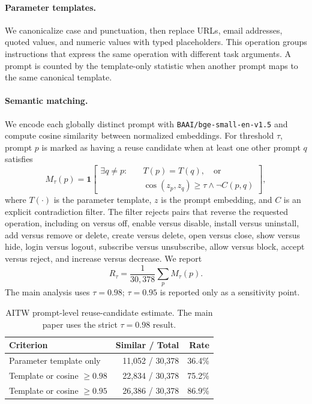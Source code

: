\paragraph{Parameter templates.}
We canonicalize case and punctuation, then replace URLs, email addresses,
quoted values, and numeric values with typed placeholders.  This operation
groups instructions that express the same operation with different task
arguments.  A prompt is counted by the template-only statistic when another
prompt maps to the same canonical template.

\paragraph{Semantic matching.}
We encode each globally distinct prompt with
\texttt{BAAI/bge-small-en-v1.5} and compute cosine similarity between normalized
embeddings.  For threshold $\tau$, prompt $p$ is marked as having a reuse
candidate when at least one other prompt $q$ satisfies
\[
  M_\tau(p)=\mathbf{1}\!\left[
  \begin{aligned}
    \exists q\neq p:\quad &T(p)=T(q),\quad\text{or}\\
    &\cos(z_p,z_q)\geq\tau \land \neg C(p,q)
  \end{aligned}
  \right],
\]
where $T(\cdot)$ is the parameter template, $z$ is the prompt embedding, and
$C$ is an explicit contradiction filter.  The filter rejects pairs that
reverse the requested operation, including on versus off, enable versus
disable, install versus uninstall, add versus remove or delete, create versus
delete, open versus close, show versus hide, login versus logout, subscribe
versus unsubscribe, allow versus block, accept versus reject, and increase
versus decrease.  We report
\[
  R_\tau=\frac{1}{30{,}378}\sum_p M_\tau(p).
\]
The main analysis uses $\tau=0.98$; $\tau=0.95$ is reported only as a
sensitivity point.

\begin{table}[t]
  \centering
  \caption{AITW prompt-level reuse-candidate estimate.  The main paper uses the
  strict $\tau=0.98$ result.}
  \label{tab:aitw-prompt-sensitivity}
  \small
  \begin{tabular}{lrr}
    \toprule
    Criterion & Similar / Total & Rate \\
    \midrule
    Parameter template only & 11,052 / 30,378 & 36.4\% \\
    Template or cosine $\geq 0.98$ & 22,834 / 30,378 & 75.2\% \\
    Template or cosine $\geq 0.95$ & 26,386 / 30,378 & 86.9\% \\
    \bottomrule
  \end{tabular}
\end{table}

